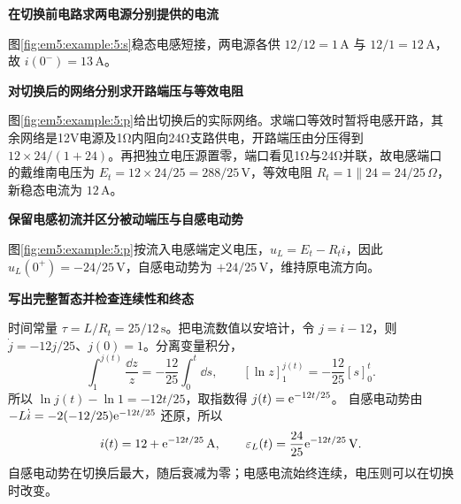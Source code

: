 \begin{solution}\textbf{在切换前电路求两电源分别提供的电流}\par\nobreak
图\ref{fig:em5:example:5:s}稳态电感短接，两电源各供 $12/12=1\,\mathrm A$ 与 $12/1=12\,\mathrm A$，故 $i(0^-)=13\,\mathrm A$。

\par\medskip{}\noindent\textbf{对切换后的网络分别求开路端压与等效电阻}\par\nobreak
图\ref{fig:em5:example:5:p}给出切换后的实际网络。求端口等效时暂将电感开路，其余网络是12V电源及1Ω内阻向24Ω支路供电，开路端压由分压得到 $12\times24/(1+24)$。再把独立电压源置零，端口看见1Ω与24Ω并联，故电感端口的戴维南电压为 $E_t=12\times24/25=288/25\,\mathrm V$，等效电阻 $R_t=1\parallel24=24/25\,\Omega$，新稳态电流为 $12\,\mathrm A$。



\par\medskip{}\noindent\textbf{保留电感初流并区分被动端压与自感电动势}\par\nobreak
图\ref{fig:em5:example:5:p}按流入电感端定义电压，$u_L=E_t-R_ti$，因此 $u_L(0^+)=-24/25\,\mathrm V$，自感电动势为 $+24/25\,\mathrm V$，维持原电流方向。

\par\medskip{}\noindent\textbf{写出完整暂态并检查连续性和终态}\par\nobreak
时间常量 $\tau=L/R_t=25/12\,\mathrm s$。把电流数值以安培计，令 $j=i-12$，则 $\dot j=-12j/25$、$j(0)=1$。分离变量积分，
\[
\int_1^{j(t)}\frac{\dd z}{z}=-\frac{12}{25}\int_0^t\dd s,
 \qquad [\ln z]_1^{j(t)}=-\frac{12}{25}[s]_0^t.
\]
所以 $\ln j(t)-\ln1=-12t/25$，取指数得 $j(t)=\mathrm e^{-12t/25}$。
自感电动势由 $-L\dot i=-2(-12/25)\mathrm e^{-12t/25}$ 还原，所以
\[i(t)=12+\mathrm e^{-12t/25}\,\mathrm A,\qquad\varepsilon_L(t)=\frac{24}{25}\mathrm e^{-12t/25}\,\mathrm V.\]
自感电动势在切换后最大，随后衰减为零；电感电流始终连续，电压则可以在切换时改变。\end{solution}
